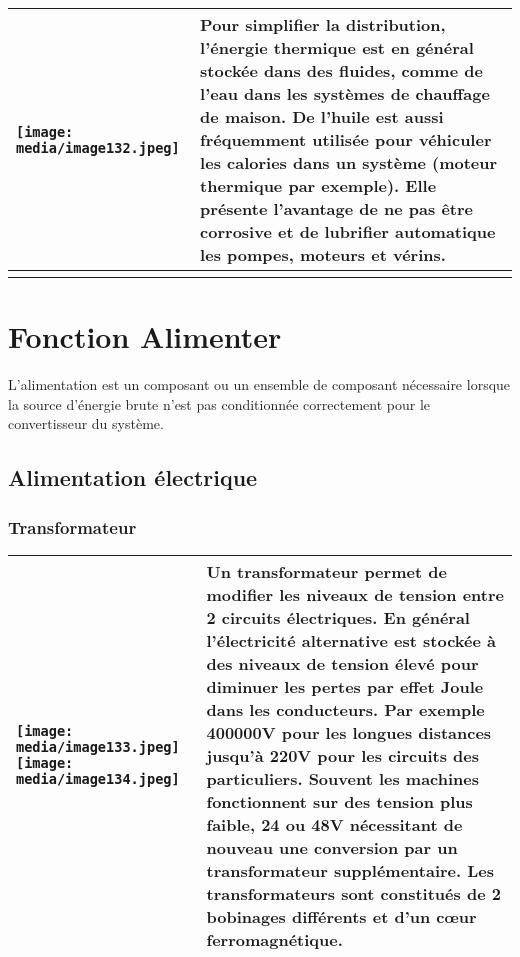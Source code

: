 \documentclass[
]{article}
\begin{document}
\begin{longtable}[]{@{}ll@{}}
\toprule
\texttt{[image: media/image132.jpeg]}
& Pour simplifier la distribution, l'énergie thermique est en général
stockée dans des fluides, comme de l'eau dans les systèmes de chauffage
de maison. De l'huile est aussi fréquemment utilisée pour véhiculer les
calories dans un système (moteur thermique par exemple). Elle présente
l'avantage de ne pas être corrosive et de lubrifier automatique les
pompes, moteurs et vérins. \\
\midrule
\endhead
& \\
\bottomrule
\end{longtable}

\hypertarget{fonction-alimenter}{%
\section{Fonction Alimenter}\label{fonction-alimenter}}

L'alimentation est un composant ou un ensemble de composant nécessaire
lorsque la source d'énergie brute n'est pas conditionnée correctement
pour le convertisseur du système.

\hypertarget{alimentation-uxe9lectrique}{%
\subsection{Alimentation électrique}\label{alimentation-uxe9lectrique}}

\hypertarget{transformateur}{%
\subsubsection{Transformateur}\label{transformateur}}

\begin{longtable}[]{@{}ll@{}}
\toprule
\endhead
\texttt{[image: media/image133.jpeg]}
\texttt{[image: media/image134.jpeg]}
& Un transformateur permet de modifier les niveaux de tension entre 2
circuits électriques. En général l'électricité alternative est stockée à
des niveaux de tension élevé pour diminuer les pertes par effet Joule
dans les conducteurs. Par exemple 400000V pour les longues distances
jusqu'à 220V pour les circuits des particuliers. Souvent les machines
fonctionnent sur des tension plus faible, 24 ou 48V nécessitant de
nouveau une conversion par un transformateur supplémentaire. Les
transformateurs sont constitués de 2 bobinages différents et d'un cœur
ferromagnétique. \\
\bottomrule
\end{longtable}
\end{document}
